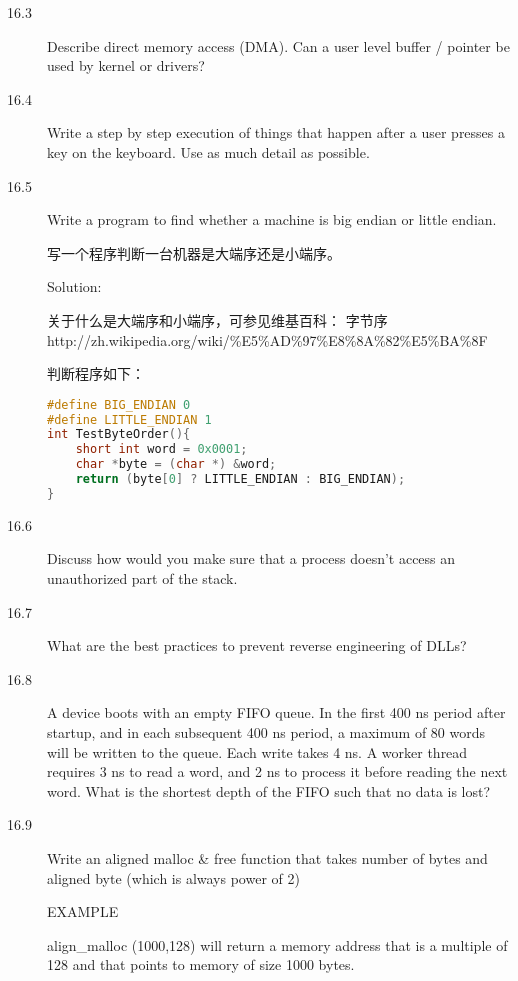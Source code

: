 \begin{description}
\item[16.3] Describe direct memory access (DMA). Can a user level buffer / pointer be used by
kernel or drivers?
%


\item[16.4] Write a step by step execution of things that happen after a user presses a key on the keyboard. Use as much detail as possible.
%


\item[16.5] Write a program to find whether a machine is big endian or little endian.

写一个程序判断一台机器是大端序还是小端序。

Solution: 

关于什么是大端序和小端序，可参见维基百科： 字节序 http://zh.wikipedia.org/wiki/\%E5\%AD\%97\%E8\%8A\%82\%E5\%BA\%8F

判断程序如下：
\begin{lstlisting}[language=C++]
#define BIG_ENDIAN 0
#define LITTLE_ENDIAN 1
int TestByteOrder(){
    short int word = 0x0001;
    char *byte = (char *) &word;
    return (byte[0] ? LITTLE_ENDIAN : BIG_ENDIAN);
}
\end{lstlisting}
%


\item[16.6] Discuss how would you make sure that a process doesn’t access an unauthorized part of the stack.
%

\item[16.7] What are the best practices to prevent reverse engineering of DLLs?	
%

\item[16.8] A device boots with an empty FIFO queue. In the first 400 ns period after startup, and in each subsequent 400 ns period, a maximum of 80 words will be written to the queue. Each write takes 4 ns. A worker thread requires 3 ns to read a word, and 2 ns to process it before reading the next word. What is the shortest depth of the FIFO such that no data is lost?
%

\item[16.9] Write an aligned malloc \& free function that takes number of bytes and aligned byte (which is always power of 2)	

EXAMPLE

align\_malloc (1000,128) will return a memory address that is a multiple of 128 and that points to memory of size 1000 bytes.


\end{description}
